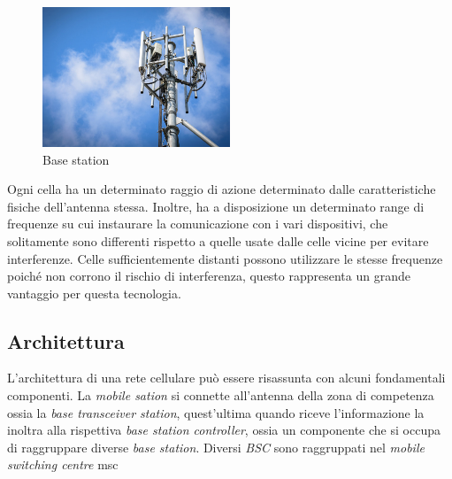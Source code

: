 \begin{figure}[h]
    \centering
    \includegraphics[width=0.5\textwidth]{images/base-station.jpg}
    \caption{Base station}
\end{figure}
Ogni cella ha un determinato raggio di azione determinato dalle caratteristiche fisiche dell'antenna stessa. Inoltre, 
ha a disposizione un determinato range di frequenze su cui instaurare la comunicazione con i vari dispositivi, che solitamente
sono differenti rispetto a quelle usate dalle celle vicine per evitare interferenze.
Celle sufficientemente distanti possono utilizzare le stesse frequenze poiché non corrono il rischio di interferenza, questo rappresenta
un grande vantaggio per questa tecnologia.
\subsection{Architettura}
L'architettura di una rete cellulare può essere risassunta con alcuni fondamentali componenti. La \textit{mobile sation} si connette all'antenna
della zona di competenza ossia la \textit{base transceiver station}, quest'ultima quando riceve l'informazione la inoltra alla rispettiva \textit{base station controller}, ossia
un componente che si occupa di raggruppare diverse \textit{base station}. 
Diversi \textit{BSC} sono raggruppati nel \textit{mobile switching centre} \gls{msc}